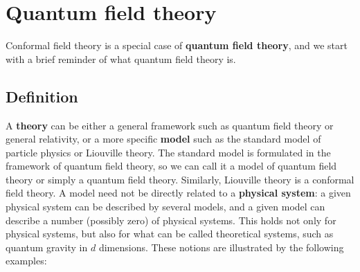\documentclass[12pt,a4paper,notitlepage]{report}
\numberwithin{equation}{section}
\theoremstyle{break}
\begin{document}
\section{Quantum field theory \label{secqft} }

Conformal field theory is a special case of \textbf{\boldmath quantum field theory}, and we start with a brief reminder of what quantum field theory is.

\subsection{Definition} 

A \textbf{\boldmath theory} can be either a general framework such as quantum field theory or general relativity, or a more specific \textbf{\boldmath model} such as the standard model of particle physics or Liouville theory.
The standard model is formulated in the framework of quantum field theory, so we can call it a model of quantum field theory or simply a quantum field theory.
Similarly, Liouville theory is a conformal field theory.
A model need not be directly related to a \textbf{\boldmath physical system}: a given physical system can be described by several models, and a given model can describe a number (possibly zero) of physical systems.
This holds not only for physical systems, but also for what can be called theoretical systems, such as quantum gravity in $d$ dimensions.
These notions are illustrated by the following examples:
\end{document}
